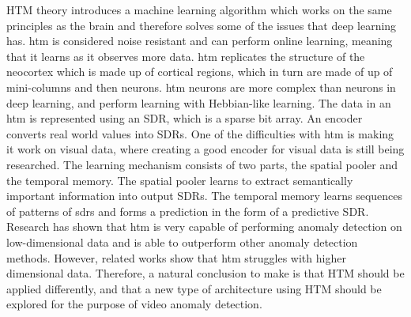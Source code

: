HTM theory introduces a machine learning algorithm which works on the same principles as the brain and therefore solves some of the issues that deep learning has. \gls*{htm} is considered noise resistant and can perform online learning, meaning that it learns as it observes more data. \gls*{htm} replicates the structure of the neocortex which is made up of cortical regions, which in turn are made of up of mini-columns and then neurons. \gls*{htm} neurons are more complex than neurons in deep learning, and perform learning with Hebbian-like learning. The data in an \gls*{htm} is represented using an SDR, which is a sparse bit array. An encoder converts real world values into SDRs. One of the difficulties with \gls*{htm} is making it work on visual data, where creating a good encoder for visual data is still being researched. The learning mechanism consists of two parts, the spatial pooler and the temporal memory. The spatial pooler learns to extract semantically important information into output SDRs. The temporal memory learns sequences of patterns of \glspl*{sdr} and forms a prediction in the form of a predictive SDR. Research has shown that \gls*{htm} is very capable of performing anomaly detection on low-dimensional data and is able to outperform other anomaly detection methods. However, related works show that \gls*{htm} struggles with higher dimensional data. Therefore, a natural conclusion to make is that HTM should be applied differently, and that a new type of architecture using HTM should be explored for the purpose of video anomaly detection.
